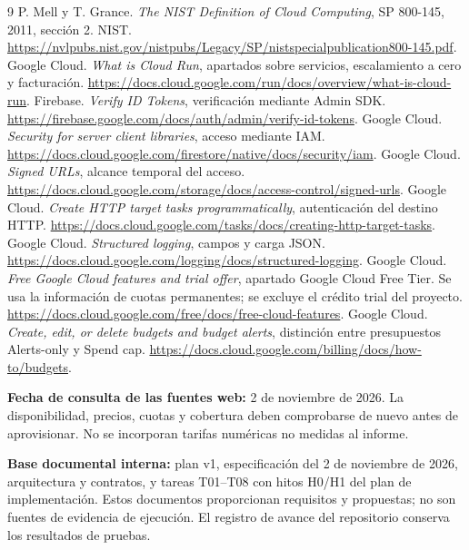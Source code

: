 \clearpage
{}
\begingroup\small
\begin{thebibliography}{9}
 P. Mell y T. Grance. \emph{The NIST Definition of Cloud Computing}, SP 800-145, 2011, sección 2. NIST. \url{https://nvlpubs.nist.gov/nistpubs/Legacy/SP/nistspecialpublication800-145.pdf}.
 Google Cloud. \emph{What is Cloud Run}, apartados sobre servicios, escalamiento a cero y facturación. \url{https://docs.cloud.google.com/run/docs/overview/what-is-cloud-run}.
 Firebase. \emph{Verify ID Tokens}, verificación mediante Admin SDK. \url{https://firebase.google.com/docs/auth/admin/verify-id-tokens}.
 Google Cloud. \emph{Security for server client libraries}, acceso mediante IAM. \url{https://docs.cloud.google.com/firestore/native/docs/security/iam}.
 Google Cloud. \emph{Signed URLs}, alcance temporal del acceso. \url{https://docs.cloud.google.com/storage/docs/access-control/signed-urls}.
 Google Cloud. \emph{Create HTTP target tasks programmatically}, autenticación del destino HTTP. \url{https://docs.cloud.google.com/tasks/docs/creating-http-target-tasks}.
 Google Cloud. \emph{Structured logging}, campos y carga JSON. \url{https://docs.cloud.google.com/logging/docs/structured-logging}.
 Google Cloud. \emph{Free Google Cloud features and trial offer}, apartado Google Cloud Free Tier. Se usa la información de cuotas permanentes; se excluye el crédito trial del proyecto. \url{https://docs.cloud.google.com/free/docs/free-cloud-features}.
 Google Cloud. \emph{Create, edit, or delete budgets and budget alerts}, distinción entre presupuestos Alerts-only y Spend cap. \url{https://docs.cloud.google.com/billing/docs/how-to/budgets}.
\end{thebibliography}
\endgroup
\textbf{Fecha de consulta de las fuentes web:} 2 de noviembre de 2026. La disponibilidad, precios, cuotas y cobertura deben comprobarse de nuevo antes de aprovisionar. No se incorporan tarifas numéricas no medidas al informe.

\textbf{Base documental interna:} plan v1, especificación del 2 de noviembre de 2026, arquitectura y contratos, y tareas T01--T08 con hitos H0/H1 del plan de implementación. Estos documentos proporcionan requisitos y propuestas; no son fuentes de evidencia de ejecución. El registro de avance del repositorio conserva los resultados de pruebas.
